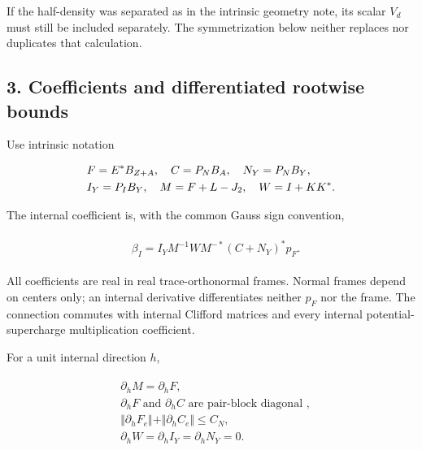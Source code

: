 If the half-density was separated as in the intrinsic geometry note, its
scalar \(V_{d}\) must still be included separately. The symmetrization
below neither replaces nor duplicates that calculation.

\subsection{3. Coefficients and differentiated rootwise
bounds}\label{g-coefficients-and-differentiated-rootwise-bounds}

Use intrinsic notation

\begin{gather*}
\begin{aligned}
& F=E^{*}B_{Z+A}, \quad  C=P_{N} B_{A}, \quad  N_{Y}=P_{N} B_{Y}, \\
& I_{Y}=P_{I} B_{Y}, \quad  M=F+L-J_{2}, \quad  W=I+KK^{*}.
\end{aligned}\notag
\end{gather*}

The internal coefficient is, with the common Gauss sign convention,

\begin{gather*}
\begin{aligned}
& \beta _{I}=I_{Y} M^{-1} W M^{-*} (C+N_{Y})^{*}p_{F}.
\end{aligned}\tag{3.1}
\end{gather*}

All coefficients are real in real trace-orthonormal frames. Normal
frames depend on centers only; an internal derivative differentiates
neither \(p_{F}\) nor the frame. The connection commutes with internal
Clifford matrices and every internal potential-supercharge
multiplication coefficient.

For a unit internal direction \(h\),

\begin{gather*}
\begin{aligned}
& \partial _{h} M=\partial _{h} F, \\
& \partial _{h} F \text{ and } \partial _{h} C \text{ are pair-block diagonal }, \\
& \Vert \partial _{h} F_{e}\Vert +\Vert \partial _{h} C_{e}\Vert  \le  C_{N}, \\
& \partial _{h} W=\partial _{h} I_{Y}=\partial _{h} N_{Y}=0.
\end{aligned}\tag{3.2}
\end{gather*}

